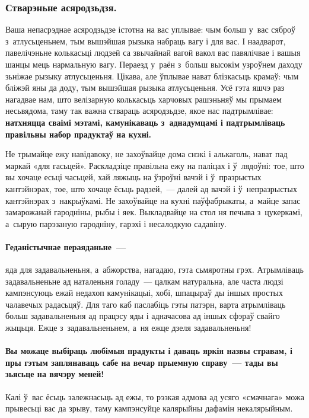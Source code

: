 \subsubsection{Стварэньне асяродзьдзя.}
Ваша непасрэднае асяродзьдзе істотна на вас уплывае: чым больш у~вас сяброў з~атлусьценьнем, тым вышэйшая рызыка набраць вагу і для вас. І наадварот, павелічэньне колькасьці людзей са звычайнай вагой вакол вас павялічвае і вашыя шанцы мець нармальную вагу. Пераезд у~раён з~больш высокім узроўнем даходу зьніжае рызыку атлусьценьня. Цікава, але ўплывае нават блізкасьць крамаў: чым бліжэй яны да доду, тым вышэйшая рызыка атлусьценьня. Усё гэта яшчэ раз нагадвае нам, што велізарную колькасьць харчовых рашэньняў мы прымаем несьвядома, таму так важна ствараць асяродзьдзе, якое нас падтрымлівае: \textbf{натхняцца сваімі мэтамі, камунікаваць з~аднадумцамі і падтрымліваць правільны набор прадуктаў на кухні.}

Не трымайце ежу навідавоку, не захоўвайце дома снэкі і алькаголь, нават пад маркай «для гасьцей». Раскладзіце правільна ежу на паліцах і ў~лядоўні: тое, што вы хочаце есьці часьцей, хай ляжыць на ўзроўні вачэй і ў~празрыстых кантэйнэрах, тое, што хочаце ёсьць радзей,~--- далей ад вачэй і ў~непразрыстых кантэйнэрах з~накрыўкамі. Не захоўвайце на кухні паўфабрыкаты, а~майце запас замарожанай гародніны, рыбы і яек. Выкладвайце на стол ня печыва з~цукеркамі, а~сырую парэзаную гародніну, гарэхі і несалодкую садавіну. 


\paragraph{Геданістычнае пераяданьне~---} яда для задавальненьня, а~абжорства, нагадаю, гэта сьмяротны грэх. Атрымліваць задавальненьне ад наталеньня голаду~--- цалкам натуральна, але часта людзі кампэнсуюць ежай недахоп камунікацыі, хобі, шпацыраў ды іншых простых чалавечых радасьцяў. Для таго каб паслабіць гэты патэрн, варта атрымліваць больш задавальненьня ад працэсу яды і адначасова ад іншых сфэраў свайго жыцьця. Ежце з~задавальненьнем, а~ня ежце дзеля задавальненьня!

\paragraph{Вы можаце выбіраць любімыя прадукты і даваць яркія назвы стравам, і пры гэтым заплянаваць сабе на вечар прыемную справу~--- тады вы зьясьце на вячэру меней!} Калі ў~вас ёсьць залежнасьць ад ежы, то рэзкая адмова ад усяго «смачнага» можа прывесьці вас да зрыву, таму кампэнсуйце калярыйны дафамін некалярыйным.

